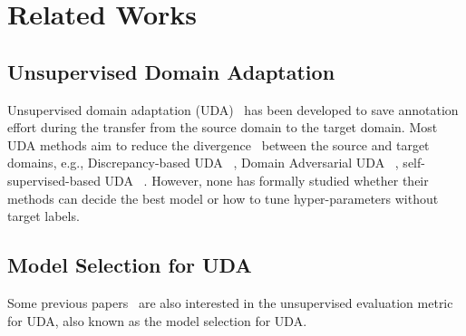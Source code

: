 \documentclass{article} %
\begin{document}



\section{Related Works}
\subsection{Unsupervised Domain Adaptation}
Unsupervised domain adaptation (UDA)~\cite{DAN} has been developed to save annotation effort during the transfer from the source domain to the target domain. Most UDA methods aim to reduce the divergence~\cite{BenDavidA,BenDavidH} between the source and target domains, e.g., Discrepancy-based UDA ~\cite{CAN,Deepcoral}, Domain Adversarial UDA ~\cite{DANN,CDAN,MCD,MDD}, self-supervised-based UDA ~\cite{Selfensembling,MCC}.
However, none has formally studied whether their methods can decide the best model or how to tune hyper-parameters without target labels. 

\subsection{Model Selection for UDA} 

Some previous papers~\cite{DEV,SND} are also interested in the unsupervised evaluation metric for UDA, also known as the model selection for UDA.
\end{document}
